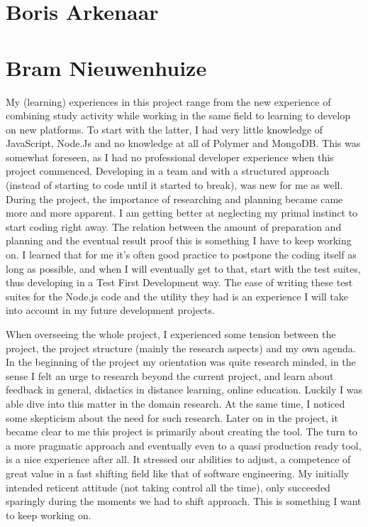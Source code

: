 
\section{Boris Arkenaar}

\section{Bram Nieuwenhuize}
My (learning) experiences in this project range from the new experience of 
combining study activity while working in the same field to learning to develop 
on new platforms.
To start with the latter, I had very little knowledge of 
JavaScript, Node.Js and no knowledge at all of Polymer and 
MongoDB. This was somewhat foreseen, as I had no 
professional developer experience when this project 
commenced. Developing in a team and with a
structured approach (instead of starting to code until it started to break),
was new for me as well. During the project, the importance of 
researching and planning became came more and more apparent. I am getting better
at neglecting my primal instinct to start coding right away. The relation 
between the amount of preparation and planning and the eventual result proof 
this is something I have to keep working on. I learned that for me it's often
good practice to postpone the coding itself as long as possible, and when I will
eventually get to that, start with the test suites, thus developing in a Test 
First Development way. The ease of writing these test suites for the Node.js
code and the utility they had is an experience I will take into account in my
future development projects.

When overseeing the whole project, I experienced some tension between the
project, the project structure (mainly the research aspects) and my own agenda.
In the beginning of the project my orientation was quite research minded, in the
sense I felt an urge to research beyond the current project, and learn about 
feedback in general, didactics in distance learning, online education. Luckily
I was able dive into this matter in the domain research. At the same time, I
noticed some skepticism about the need for such research. Later on in the 
project, it became clear to me this project is primarily about creating the 
tool. The turn to a more pragmatic approach and eventually even to a quasi 
production ready tool, is a nice experience after all. It stressed our 
abilities to adjust, a competence of great value in a fast shifting field like 
that of software engineering. My initially intended reticent attitude (not taking control all the time), only succeeded sparingly during the moments we had to shift approach. This is something I want to keep working on.

